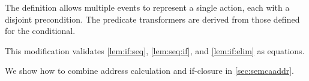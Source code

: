 \begin{definition}
\begin{minipage}{1.0\linewidth}
\begin{multicols}{2}
  \end{multicols}
  \end{minipage}
\end{definition}
The definition allows multiple events to represent a single action, each with
a disjoint precondition.  The predicate transformers are derived from those
defined for the conditional.

This modification validates
\ref{lem:if:seq}, \ref{lem:seq:if}, and \ref{lem:if:elim} as equations.

We show how to combine address calculation and if-closure in
\textsection\ref{sec:semcaaddr}.


\endinput

